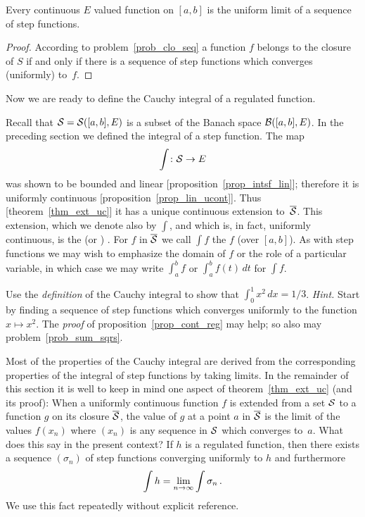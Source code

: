 \begin{cor}  Every continuous $E$ valued function on $[a,b]$ is the uniform limit of a sequence
of step functions.
\end{cor}

\begin{proof}  According to problem~\ref{prob_clo_seq} a function $f$ belongs to the
closure of $S$ if and only if there is a sequence of step functions which converges
(uniformly) to~$f$.
\end{proof}

Now we are ready to define the Cauchy integral of a regulated function.

\begin{defn} Recall that $\mathcal{S} = \mathcal{S}([a,b],E)$ is a subset of the Banach space
$\mathcal{B}([a,b],E)$. In the preceding section we defined the integral of a step function.
The map
 \[ \int \colon \mathcal{S} \rightarrow E \]
was shown to be bounded and linear [proposition~\ref{prop_intsf_lin}]; therefore it is
uniformly continuous [proposition~\ref{prop_lin_ucont}].  Thus [theorem~\ref{thm_ext_uc}] it
has a unique continuous extension to~$\overline{\mathcal{S}}$.  This extension, which we denote also by
$\int$, and which is, in fact, uniformly continuous, is the
 (or ) .  For $f$ in $\overline{\mathcal{S}}$ we call $\int
f$ the  $f$ (over $[a,b]$). As with step functions we may wish to emphasize
the domain of $f$ or the role of a particular variable, in which case we may write $\int_a^bf$
or $\int_a^bf(t)\,dt$ for $\int f$.
\end{defn}

\begin{prob}  Use the \emph{definition} of the Cauchy integral to show that
$\int_0^1x^2\,dx = 1/3$. \emph{Hint.}  Start by finding a sequence of step functions
which converges uniformly to the function $x \mapsto x^2$.  The \emph{proof} of
proposition~\ref{prop_cont_reg} may help; so also may problem~\ref{prob_sum_sqrs}.
\end{prob}


Most of the properties of the Cauchy integral are derived from the corresponding
properties of the integral of step functions by taking limits.  In the remainder of this
section it is well to keep in mind one aspect of theorem~\ref{thm_ext_uc} (and its
proof): When a uniformly continuous function $f$ is extended from a set $\mathcal{S}$ to a
function $g$ on its closure $\overline{\mathcal{S}}$, the value of $g$ at a point $a$ in $\overline{\mathcal{S}}$ is the limit of the values $f(x_n)$ where $(x_n)$ is any sequence in $\mathcal{S}$ which
converges to~$a$.  What does this say in the present context?  If $h$ is a regulated
function, then there exists a sequence $(\sigma_n)$ of step functions converging
uniformly to $h$ and furthermore
  \[ \int h = \lim_{n\rightarrow\infty} \int\sigma_n\,. \]
We use this fact repeatedly without explicit reference.

